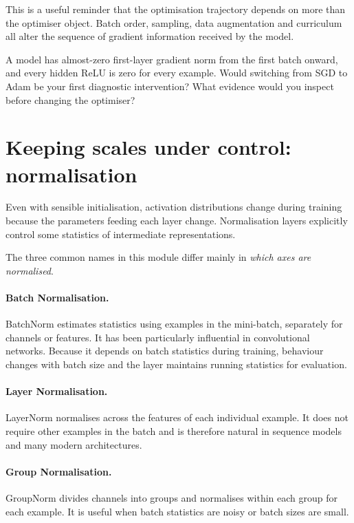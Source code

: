 This is a useful reminder that the optimisation trajectory depends on more than the optimiser object. Batch order, sampling, data augmentation and curriculum all alter the sequence of gradient information received by the model.

\begin{checkpointbox}
A model has almost-zero first-layer gradient norm from the first batch onward, and every hidden ReLU is zero for every example. Would switching from SGD to Adam be your first diagnostic intervention? What evidence would you inspect before changing the optimiser?
\end{checkpointbox}

\section{Keeping scales under control: normalisation}

Even with sensible initialisation, activation distributions change during training because the parameters feeding each layer change. Normalisation layers explicitly control some statistics of intermediate representations.

The three common names in this module differ mainly in \emph{which axes are normalised}.

\paragraph{Batch Normalisation.}
BatchNorm estimates statistics using examples in the mini-batch, separately for channels or features. It has been particularly influential in convolutional networks. Because it depends on batch statistics during training, behaviour changes with batch size and the layer maintains running statistics for evaluation.

\paragraph{Layer Normalisation.}
LayerNorm normalises across the features of each individual example. It does not require other examples in the batch and is therefore natural in sequence models and many modern architectures.

\paragraph{Group Normalisation.}
GroupNorm divides channels into groups and normalises within each group for each example. It is useful when batch statistics are noisy or batch sizes are small.

